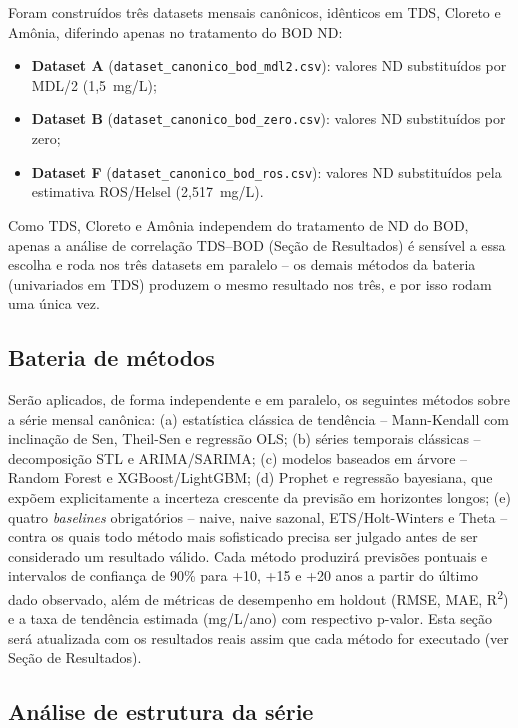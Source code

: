 Foram construídos três datasets mensais canônicos, idênticos em TDS, Cloreto e Amônia, diferindo apenas no tratamento do BOD ND:

\begin{itemize}
    \item \textbf{Dataset A} (\texttt{dataset\_canonico\_bod\_mdl2.csv}): valores ND substituídos por MDL/2 (1,5~mg/L);
    \item \textbf{Dataset B} (\texttt{dataset\_canonico\_bod\_zero.csv}): valores ND substituídos por zero;
    \item \textbf{Dataset F} (\texttt{dataset\_canonico\_bod\_ros.csv}): valores ND substituídos pela estimativa ROS/Helsel (2,517~mg/L).
\end{itemize}

Como TDS, Cloreto e Amônia independem do tratamento de ND do BOD, apenas a análise de correlação TDS--BOD (Seção de Resultados) é sensível a essa escolha e roda nos três datasets em paralelo -- os demais métodos da bateria (univariados em TDS) produzem o mesmo resultado nos três, e por isso rodam uma única vez.

\subsection{Bateria de métodos}

Serão aplicados, de forma independente e em paralelo, os seguintes métodos sobre a série mensal canônica: (a) estatística clássica de tendência -- Mann-Kendall com inclinação de Sen, Theil-Sen e regressão OLS; (b) séries temporais clássicas -- decomposição STL e ARIMA/SARIMA; (c) modelos baseados em árvore -- Random Forest e XGBoost/LightGBM; (d) Prophet e regressão bayesiana, que expõem explicitamente a incerteza crescente da previsão em horizontes longos; (e) quatro \textit{baselines} obrigatórios -- naive, naive sazonal, ETS/Holt-Winters e Theta -- contra os quais todo método mais sofisticado precisa ser julgado antes de ser considerado um resultado válido. Cada método produzirá previsões pontuais e intervalos de confiança de 90\% para +10, +15 e +20 anos a partir do último dado observado, além de métricas de desempenho em holdout (RMSE, MAE, R\textsuperscript{2}) e a taxa de tendência estimada (mg/L/ano) com respectivo p-valor. Esta seção será atualizada com os resultados reais assim que cada método for executado (ver Seção de Resultados).

\subsection{Análise de estrutura da série}

